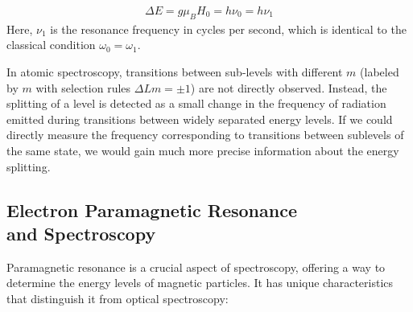 \begin{align}
    \Delta E = g\mu_B H_0 = h\nu_0 = h\nu_1
\end{align}
Here, $\nu_1$ is the resonance frequency in cycles per second, which is identical to the classical condition $\omega_0=\omega_1$.

In atomic spectroscopy, transitions between sub-levels with different $m$ (labeled by $m$ with selection
rules $\Delta Lm = \pm 1$) are not directly observed. Instead,
the splitting of a level is detected as a small change
in the frequency of radiation emitted during transitions between widely separated energy levels. If we
could directly measure the frequency corresponding
to transitions between sublevels of the same state,
we would gain much more precise information about
the energy splitting.

\subsection*{Electron Paramagnetic Resonance\\and Spectroscopy}

Paramagnetic resonance is a crucial aspect of spectroscopy, offering a way to determine the energy levels of magnetic particles. It has unique characteristics that distinguish it from optical spectroscopy:\\


